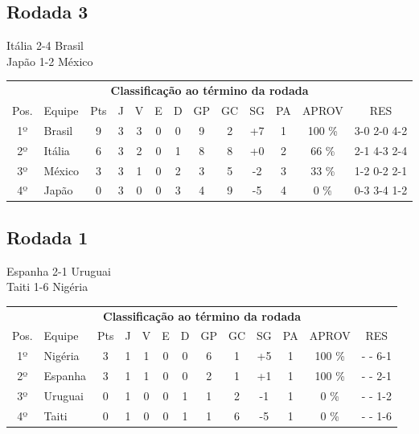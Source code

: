 \documentclass{article}
\begin{document}
\subsection*{Rodada 3}
Itália 2-4 Brasil\\
Japão 1-2 México\\
\begin{center}
\begin{tabular}{| c | l | c | c | c | c | c | c | c | c | c | c | c |}
\multicolumn{13}{c}{\textbf{Classificação ao término da rodada}}\\
Pos.&Equipe&Pts&J&V&E&D&GP&GC&SG&PA&APROV&RES\\
1º&Brasil              &9&3	&3&0&0	&9&2&+7	&1&100 \%	&3-0 2-0 4-2 \\
2º&Itália              &6&3	&2&0&1	&8&8&+0	&2& 66 \%	&2-1 4-3 2-4 \\
3º&México              &3&3	&1&0&2	&3&5&-2	&3& 33 \%	&1-2 0-2 2-1 \\
4º&Japão               &0&3	&0&0&3	&4&9&-5	&4&  0 \%	&0-3 3-4 1-2 \\
\end{tabular}
\end{center}


\subsection*{Rodada 1}
Espanha 2-1 Uruguai\\
Taiti 1-6 Nigéria\\
\begin{center}
\begin{tabular}{| c | l | c | c | c | c | c | c | c | c | c | c | c |}
\multicolumn{13}{c}{\textbf{Classificação ao término da rodada}}\\
Pos.&Equipe&Pts&J&V&E&D&GP&GC&SG&PA&APROV&RES\\
1º&Nigéria             &3&1	&1&0&0	&6&1&+5	&1&100 \%	& -  - 6-1 \\
2º&Espanha             &3&1	&1&0&0	&2&1&+1	&1&100 \%	& -  - 2-1 \\
3º&Uruguai             &0&1	&0&0&1	&1&2&-1	&1&  0 \%	& -  - 1-2 \\
4º&Taiti               &0&1	&0&0&1	&1&6&-5	&1&  0 \%	& -  - 1-6 \\
\end{tabular}
\end{center}
\end{document}
